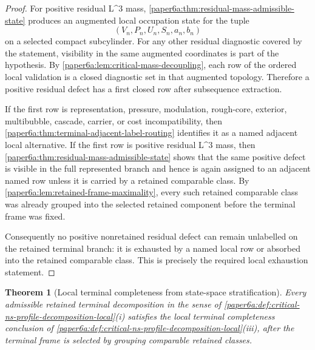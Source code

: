 \documentclass[11pt]{amsart}
\def\({}%
\def\){}%
\theoremstyle{plain}
\newtheorem{theorem}{Theorem}[section]
\theoremstyle{definition}
\theoremstyle{remark}
\begin{document}
\begin{proof}
For positive residual \(L^3\) mass,
\cref{paper6a:thm:residual-mass-admissible-state} produces an augmented local
occupation state for the tuple
\[
  (V_n,P_n,U_n,S_n,a_n,b_n)
\]
on a selected compact subcylinder.  For any other residual diagnostic covered
by the statement, visibility in the same augmented coordinates is part of the
hypothesis.  By
\cref{paper6a:lem:critical-mass-decoupling}, each row of the ordered local
validation is a closed diagnostic set in that augmented topology.  Therefore a
positive residual defect has a first closed row after subsequence extraction.

If the first row is representation, pressure, modulation, rough-core, exterior,
multibubble, cascade, carrier, or cost incompatibility, then
\cref{paper6a:thm:terminal-adjacent-label-routing} identifies it as a named
adjacent local alternative.  If the first row is positive residual \(L^3\)
mass, then \cref{paper6a:thm:residual-mass-admissible-state} shows that the
same positive defect is visible in the full represented branch and hence is
again assigned to an adjacent named row unless it is carried by a retained
comparable class.  By \cref{paper6a:lem:retained-frame-maximality}, every such
retained comparable class was already grouped into the selected retained
component before the terminal frame was fixed.

Consequently no positive nonretained residual defect can remain unlabelled on
the retained terminal branch: it is exhausted by a named local row or absorbed
into the retained comparable class.  This is precisely the required local
exhaustion statement.
\end{proof}

\begin{theorem}[Local terminal completeness from state-space stratification]
\label{paper6a:thm:critical-ns-profile-decomposition-discharged}
Every admissible retained terminal decomposition in the sense of
\cref{paper6a:def:critical-ns-profile-decomposition-local}\textup{(i)} satisfies the
local terminal completeness conclusion of
\cref{paper6a:def:critical-ns-profile-decomposition-local}\textup{(iii)}, after the
terminal frame is selected by grouping comparable retained classes.
\end{theorem}
\end{document}
